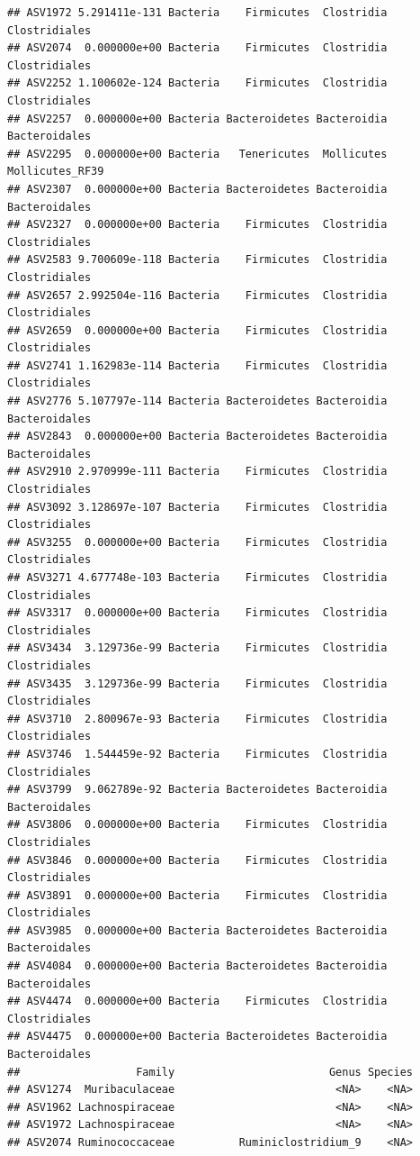 \documentclass[]{article}
\begin{document}
\begin{verbatim}
## ASV1972 5.291411e-131 Bacteria    Firmicutes  Clostridia   Clostridiales
## ASV2074  0.000000e+00 Bacteria    Firmicutes  Clostridia   Clostridiales
## ASV2252 1.100602e-124 Bacteria    Firmicutes  Clostridia   Clostridiales
## ASV2257  0.000000e+00 Bacteria Bacteroidetes Bacteroidia   Bacteroidales
## ASV2295  0.000000e+00 Bacteria   Tenericutes  Mollicutes Mollicutes_RF39
## ASV2307  0.000000e+00 Bacteria Bacteroidetes Bacteroidia   Bacteroidales
## ASV2327  0.000000e+00 Bacteria    Firmicutes  Clostridia   Clostridiales
## ASV2583 9.700609e-118 Bacteria    Firmicutes  Clostridia   Clostridiales
## ASV2657 2.992504e-116 Bacteria    Firmicutes  Clostridia   Clostridiales
## ASV2659  0.000000e+00 Bacteria    Firmicutes  Clostridia   Clostridiales
## ASV2741 1.162983e-114 Bacteria    Firmicutes  Clostridia   Clostridiales
## ASV2776 5.107797e-114 Bacteria Bacteroidetes Bacteroidia   Bacteroidales
## ASV2843  0.000000e+00 Bacteria Bacteroidetes Bacteroidia   Bacteroidales
## ASV2910 2.970999e-111 Bacteria    Firmicutes  Clostridia   Clostridiales
## ASV3092 3.128697e-107 Bacteria    Firmicutes  Clostridia   Clostridiales
## ASV3255  0.000000e+00 Bacteria    Firmicutes  Clostridia   Clostridiales
## ASV3271 4.677748e-103 Bacteria    Firmicutes  Clostridia   Clostridiales
## ASV3317  0.000000e+00 Bacteria    Firmicutes  Clostridia   Clostridiales
## ASV3434  3.129736e-99 Bacteria    Firmicutes  Clostridia   Clostridiales
## ASV3435  3.129736e-99 Bacteria    Firmicutes  Clostridia   Clostridiales
## ASV3710  2.800967e-93 Bacteria    Firmicutes  Clostridia   Clostridiales
## ASV3746  1.544459e-92 Bacteria    Firmicutes  Clostridia   Clostridiales
## ASV3799  9.062789e-92 Bacteria Bacteroidetes Bacteroidia   Bacteroidales
## ASV3806  0.000000e+00 Bacteria    Firmicutes  Clostridia   Clostridiales
## ASV3846  0.000000e+00 Bacteria    Firmicutes  Clostridia   Clostridiales
## ASV3891  0.000000e+00 Bacteria    Firmicutes  Clostridia   Clostridiales
## ASV3985  0.000000e+00 Bacteria Bacteroidetes Bacteroidia   Bacteroidales
## ASV4084  0.000000e+00 Bacteria Bacteroidetes Bacteroidia   Bacteroidales
## ASV4474  0.000000e+00 Bacteria    Firmicutes  Clostridia   Clostridiales
## ASV4475  0.000000e+00 Bacteria Bacteroidetes Bacteroidia   Bacteroidales
##                  Family                        Genus Species
## ASV1274  Muribaculaceae                         <NA>    <NA>
## ASV1962 Lachnospiraceae                         <NA>    <NA>
## ASV1972 Lachnospiraceae                         <NA>    <NA>
## ASV2074 Ruminococcaceae          Ruminiclostridium_9    <NA>

\end{verbatim}
\end{document}
